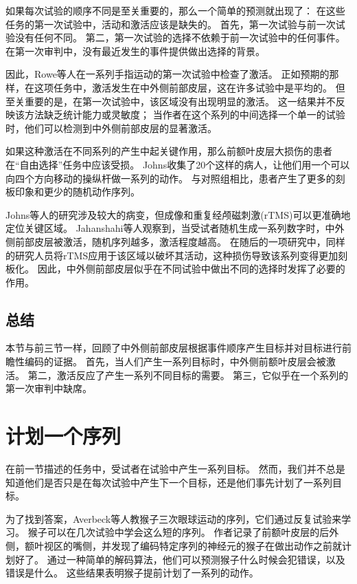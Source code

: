 如果每次试验的顺序不同是至关重要的，那么一个简单的预测就出现了：
在这些任务的第一次试验中，活动和激活应该是缺失的。
首先，第一次试验与前一次试验没有任何不同。
第二，第一次试验的选择不依赖于前一次试验中的任何事件。
在第一次审判中，没有最近发生的事件提供做出选择的背景。


因此，Rowe等人\cite{rowe2010action}在一系列手指运动的第一次试验中检查了激活。
正如预期的那样，在这项任务中，激活发生在中外侧前部皮层，这在许多试验中是平均的。
但至关重要的是，在第一次试验中，该区域没有出现明显的激活。
这一结果并不反映该方法缺乏统计能力或灵敏度；
当作者在这个系列的中间选择一个单一的试验时，他们可以检测到中外侧前部皮层的显著激活。


如果这种激活在不同系列的产生中起关键作用，那么前额叶皮层大损伤的患者在“自由选择”任务中应该受损。
Johns\cite{johns1996effects}收集了20个这样的病人，让他们用一个可以向四个方向移动的操纵杆做一系列的动作。
与对照组相比，患者产生了更多的刻板印象和更少的随机动作序列。


Johns等人的研究涉及较大的病变，但成像和重复经颅磁刺激(rTMS)可以更准确地定位关键区域。
Jahanshahi等人\cite{jahanshahi2000role}观察到，当受试者随机生成一系列数字时，中外侧前部皮层被激活，随机序列越多，激活程度越高。
在随后的一项研究中\cite{jahanshahi1998left}，同样的研究人员将rTMS应用于该区域以破坏其活动，这种损伤导致该系列变得更加刻板化。
因此，中外侧前部皮层似乎在不同试验中做出不同的选择时发挥了必要的作用。



\subsection{总结}

本节与前三节一样，回顾了中外侧前部皮层根据事件顺序产生目标并对目标进行前瞻性编码的证据。
首先，当人们产生一系列目标时，中外侧前额叶皮层会被激活。
第二，激活反应了产生一系列不同目标的需要。
第三，它似乎在一个系列的第一次审判中缺席。



\section{计划一个序列}

在前一节描述的任务中，受试者在试验中产生一系列目标。
然而，我们并不总是知道他们是否只是在每次试验中产生下一个目标，还是他们事先计划了一系列目标。


为了找到答案，Averbeck等人\cite{averbeck2006activity}教猴子三次眼球运动的序列，它们通过反复试验来学习。
猴子可以在几次试验中学会这么短的序列。
作者记录了前额叶皮层的后外侧，额叶视区的嘴侧，并发现了编码特定序列的神经元的猴子在做出动作之前就计划好了。
通过一种简单的解码算法，他们可以预测猴子什么时候会犯错误，以及错误是什么。
这些结果表明猴子提前计划了一系列的动作。


